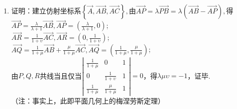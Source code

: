 \documentclass[UTF8]{ctexart}
\begin{document}
\begin{enumerate}
\item 证明：建立仿射坐标系$\left\{\overrightarrow{A},\overrightarrow{AB},\overrightarrow{AC}\right\},$由$\overrightarrow{AP}=\lambda\overrightarrow{PB}=\lambda\left(\overrightarrow{AB}-\overrightarrow{AP}\right),$得$\overrightarrow{AP}=\displaystyle\frac{\lambda}{\lambda+1}\overrightarrow{AB},\overrightarrow{AP}=\left(\displaystyle\frac{\lambda}{\lambda+1},0\right)$;\\
$\overrightarrow{AR}=\displaystyle\frac{1}{1+\upsilon}\overrightarrow{AC},\overrightarrow{AR}=\left(0,\displaystyle\frac{1}{1+\upsilon}\right)$;\\
$\overrightarrow{AQ}=\displaystyle\frac{1}{1+\mu}\overrightarrow{AB}+\displaystyle\frac{\mu}{1+\mu}\overrightarrow{AC},\overrightarrow{AQ}=\left(\displaystyle\frac{1}{1+\mu},\displaystyle\frac{\mu}{1+\mu}\right)$;\\
由$P,Q,R$共线当且仅当$\left|\begin{array}{ccc}\displaystyle\frac{1}{1+\mu}&0&1\\ 0&\displaystyle\frac{1}{1+\upsilon}&1\\ \displaystyle\frac{1}{1+\mu}&\displaystyle\frac{\mu}{1+\mu}&1\end{array}\right|=0$，得$\lambda\mu\upsilon=-1$，证毕. \\
（注：事实上，此即平面几何上的梅涅劳斯定理）
\end{enumerate}
\end{document}
